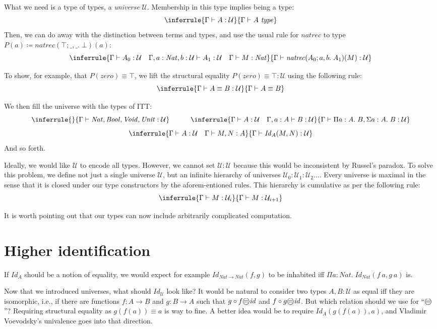 \documentclass{article} \usepackage{chtt-notes} \usepackage{stmaryrd}
\newcommand{\entails}{\vdash}
\newcommand{\G}{\Gamma}
\newcommand{\atype}[1]{#1~\mathit{type}}
\newcommand{\Nat}{\mathit{Nat}}
\newcommand{\circled}[1]{\text{\textcircled{#1}}}
\begin{document}
What we need is a type of types, a \emph{universe} $\mathcal{U}$.
Membership in this type implies being a type:
\[ \inferrule{\G \entails A : \mathcal{U}}{\G \entails \atype{A}} \]
Then, we can do away with the distinction between terms and types, and use the usual rule for $\mathit{natrec}$ to type $P(a) \coloneqq \mathit{natrec}(\top; \_, \_. \; \bot)(a)$:
\[ \inferrule{\G \entails A_0 : \mathcal{U} \quad \G, a : \Nat, b : \mathcal{U} \entails A_1 : \mathcal{U} \quad \G \entails M : \Nat}{\G \entails \mathit{natrec}(A_0; a, b.\; A_1)(M) : \mathcal{U}} \]

To show, for example, that $P(\mathit{zero}) \equiv \top$, we lift the structural equality $P(\mathit{zero}) \equiv \top : \mathcal{U}$ using the following rule:
\[ \inferrule{\G \entails A \equiv B : \mathcal{U}}{\G \entails A \equiv B} \]

We then fill the universe with the types of ITT:
\[ \inferrule{}{\G \entails \Nat, \mathit{Bool}, \mathit{Void}, \mathit{Unit} : \mathcal{U}} \quad \quad \quad \inferrule{\G \entails A : \mathcal{U} \quad \G, a: A \entails B : \mathcal{U}}{\G \entails \Pi a : A.\; B, \Sigma a : A.\; B : \mathcal{U}}\]
\[ \inferrule{\G \entails A : \mathcal{U} \quad \G \entails M, N : A}{\G \entails \mathit{Id}_A(M, N) : \mathcal{U}} \]
And so forth.

Ideally, we would like $\mathcal{U}$ to encode all types.
However, we cannot set $\mathcal{U} : \mathcal{U}$ because this would be inconsistent by Russel's paradox.
To solve this problem, we define not just a single universe $\mathcal{U}$, but an infinite hierarchy of universes $\mathcal{U}_0: \mathcal{U}_1: \mathcal{U}_2 \dots$.
Every universe is maximal in the sense that it is closed under our type constructors by the aforem-entioned rules.
This hierarchy is cumulative as per the following rule:
\[ \inferrule{\G \entails M : \mathcal{U}_i}{\G \entails M : \mathcal{U}_{i + 1}}\]

It is worth pointing out that our types can now include arbitrarily complicated computation.

\section{Higher identification}
If $\mathit{Id}_A$ should be a notion of equality, we would expect for example $\mathit{Id}_{\Nat \to \Nat}(f, g)$ to be inhabited iff $\Pi a: \Nat.\; \mathit{Id}_{\Nat}(f~a, g~a)$ is.

Now that we introduced universes, what should $\mathit{Id}_{\mathcal{U}}$ look like?
It would be natural to consider two types $A, B : \mathcal{U}$ as equal iff they are isomorphic, i.e., if there are functions $f : A \to B$ and $g : B \to A$ such that $g \circ f \circled{=} \mathit{id}$ and $f \circ g \circled{=} \mathit{id}$.
But which relation should we use for ``$\circled{=}$''?
Requiring structural equality as $g(f(a)) \equiv a$ is way to fine.
A better idea would be to require $\mathit{Id}_A(g(f(a)), a)$, and Vladimir Voevodsky's univalence goes into that direction. \medskip
\end{document}
